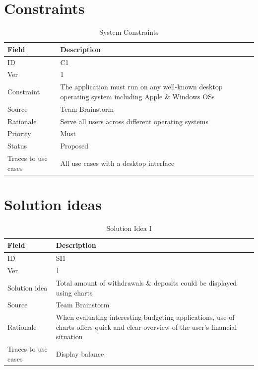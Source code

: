 \documentclass[12pt]{article}
\begin{document}
\section{Constraints}
\begin{table}[H]
\caption{System Constraints}
  \begin{center}
    \begin{tabular}{|l|p{10cm}|}
      \hline
      Field & Description\\
      \hline\hline
      ID & C1\\
      \hline
      Ver & 1\\
      \hline
      Constraint & The application must run on any well-known desktop operating system including Apple \& Windows OSs\\
      \hline
      Source & Team Brainstorm\\
      \hline
      Rationale & Serve all users across different operating systems\\
      \hline
      Priority & Must\\
      \hline
      Status & Proposed\\
      \hline
      Traces to use cases & All use cases with a desktop interface\\
      \hline
    \end{tabular}
  \end{center}
\end{table}

\section{Solution ideas}
\begin{table}[H]
\caption{Solution Idea I}
  \begin{center}
    \begin{tabular}{|l|p{10cm}|}
      \hline
      Field & Description\\
      \hline\hline
      ID & SI1\\
      \hline
      Ver & 1\\
      \hline
      Solution idea & Total amount of withdrawals \& deposits could be displayed using charts\\
      \hline
      Source & Team Brainstorm\\
      \hline
      Rationale & When evaluating interesting budgeting applications, use of charts offers quick and clear overview of the user's financial situation\\
      \hline
      Traces to use cases & Display balance\\
      \hline
    \end{tabular}
  \end{center}
\end{table}
\end{document}
